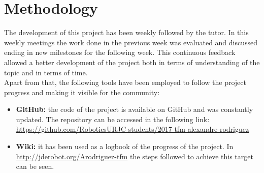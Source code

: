 \section{Methodology} \label{Methodology}
The development of this project has been weekly followed by the tutor. In this weekly meetings the work done in the previous week was evaluated and discussed ending in new milestones for the following week. This continuous feedback allowed a better development of the project both in terms of understanding of the topic and in terms of time.\\
Apart from that, the following tools have been employed to follow the project progress and making it visible for the community:
\begin{itemize}
    \item \textbf{GitHub:} the code of the project is available on GitHub and was constantly updated. The repository can be accessed in the following link: \url{https://github.com/RoboticsURJC-students/2017-tfm-alexandre-rodriguez}
    \item \textbf{Wiki:} it has been used as a logbook of the progress of the project. In \url{http://jderobot.org/Arodriguez-tfm} the steps followed to achieve this target can be seen.
\end{itemize}
